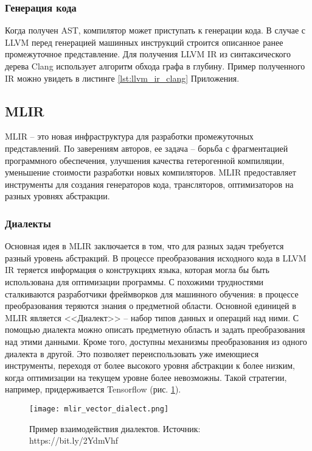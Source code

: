 
\subsubsection{Генерация кода}
Когда получен AST, компилятор может приступать к генерации кода. В случае с LLVM
перед генерацией машинных инструкций строится описанное ранее промежуточное
представление. Для получения LLVM IR из синтаксического дерева Clang использует
алгоритм обхода графа в глубину. Пример полученного IR можно увидеть в листинге
\ref{lst:llvm_ir_clang} Приложения.

\subsection{MLIR}
MLIR -- это новая инфраструктура для разработки промежуточных представлений.
По заверениям авторов, ее задача -- борьба с фрагментацией программного
обеспечения, улучшения качества гетерогенной компиляции, уменьшение стоимости
разработки новых компиляторов. MLIR предоставляет инструменты для создания
генераторов кода, трансляторов, оптимизаторов на разных уровнях абстракции\cite{Lattner2020}.
\subsubsection{Диалекты}
Основная идея в MLIR заключается в том, что для разных задач требуется разный
уровень абстракций. В процессе преобразования исходного кода в LLVM IR теряется
информация о конструкциях языка, которая могла бы быть использована для
оптимизации программы. С похожими трудностями сталкиваются разработчики
фреймворков для машинного обучения: в процессе преобразования теряются знания
о предметной области. Основной единицей в MLIR является <<Диалект>> -- набор
типов данных и операций над ними. С помощью диалекта можно описать предметную
область и задать преобразования над этими данными. Кроме того, доступны
механизмы преобразования из одного диалекта в другой. Это позволяет
переиспользовать уже имеющиеся инструменты, переходя от более высокого уровня
абстракции к более низким, когда оптимизации на текущем уровне более невозможны.
Такой стратегии, например, придерживается Tensorflow (рис. \ref{fig:tf_dialects}).
\begin{figure}[h]
    \centering
    \texttt{[image: mlir\_vector\_dialect.png]}
    \caption{Пример взаимодействия диалектов. Источник: https://bit.ly/2YdmVhf
    }
    \label{fig:tf_dialects}
\end{figure}
